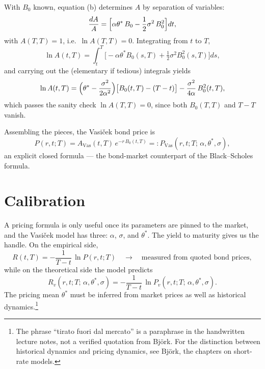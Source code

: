 With $B_0$ known, equation (b) determines $A$ by separation of variables:
\begin{equation}
\frac{dA}{A} = \Bigl[\alpha\theta^*\,B_0 - \frac{1}{2}\sigma^2\,B_0^2\Bigr]dt,
\end{equation}
with $A(T,T) = 1$, i.e.\ $\ln A(T,T) = 0$.
Integrating from $t$ to $T$,
\begin{equation}
\ln A(t,T) = \int_t^T \bigl[-\alpha\theta^* B_0(s,T) + \tfrac12\sigma^2 B_0^2(s,T)\bigr]ds,
\end{equation}
and carrying out the (elementary if tedious) integrals yields
\begin{equation}\label{eq:vasicek-A}
\ln A(t,T) = \Bigl(\theta^* - \frac{\sigma^2}{2\alpha^2}\Bigr)\bigl[B_0(t,T) - (T-t)\bigr] - \frac{\sigma^2}{4\alpha}\,B_0^2(t,T),
\end{equation}
which passes the sanity check $\ln A(T,T)=0$, since both $B_0(T,T)$ and $T-T$ vanish.

Assembling the pieces, the Vasi\v{c}ek bond price is
\begin{equation}
P(r,t;T) = A_{\text{Vas}}(t,T)\, e^{-r\,B_0(t,T)} =: P_{\text{Vas}}(r,t;T;\, \alpha, \theta^*, \sigma),
\end{equation}
an explicit closed formula --- the bond-market counterpart of the Black--Scholes formula.


\section{Calibration}\label{sec:vasicek-calibration}

A pricing formula is only useful once its parameters are pinned to the market, and the Vasi\v{c}ek model has three: $\alpha$, $\sigma$, and $\theta^*$.
The yield to maturity gives us the handle.
On the empirical side,
\begin{equation}
R(t,T) = -\frac{1}{T-t}\,\ln P(r,t;T) \quad\longrightarrow\quad \text{measured from quoted bond prices},
\end{equation}
while on the theoretical side the model predicts
\begin{equation}
R_v(r,t;T;\,\alpha,\theta^*,\sigma) = -\frac{1}{T-t}\,\ln P_v(r,t;T;\,\alpha,\theta^*,\sigma).
\end{equation}
The pricing mean $\theta^*$ must be inferred from market prices as well as historical dynamics.\footnote{The phrase ``tirato fuori dal mercato'' is a paraphrase in the handwritten lecture notes, not a verified quotation from Bj\"ork.
For the distinction between historical dynamics and pricing dynamics, see Bj\"ork\cite{Bjork2020}, the chapters on short-rate models.}


